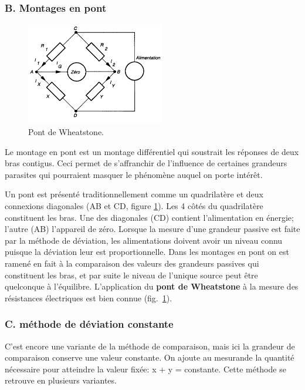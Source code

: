 \subsubsection{B. Montages en pont}

\begin{figure}
   \centering
   \includegraphics[width=6cm]{assets/figures/wheatstone.pdf}
   \caption{Pont de Wheatstone.}
   \label{fig:pont}
\end{figure}
Le montage en pont est un montage différentiel qui soustrait les réponses de deux bras contigus. Ceci permet de s'affranchir de l'influence de certaines grandeurs parasites qui pourraient masquer le phénomène auquel on porte intérêt.

Un pont est présenté traditionnellement comme un quadrilatère et deux connexions diagonales (AB et CD, figure \ref{fig:pont}). Les 4 côtés du quadrilatère constituent les bras. Une des diagonales (CD) contient l'alimentation en énergie; l'autre (AB) l'appareil de zéro. Lorsque la mesure d'une grandeur passive est faite par la méthode de déviation, les alimentations doivent avoir un niveau connu puisque la déviation leur est proportionnelle. Dans les montages en pont on est ramené en fait à la comparaison des valeurs des grandeurs passives qui constituent les bras, et par suite le niveau de l'unique source peut être quelconque à l'équilibre. L'application du \textbf{pont de Wheatstone} à la mesure des résistances électriques est bien connue (fig.~\ref{fig:pont}).

\subsubsection{C. méthode de déviation constante}

C'est encore une variante de la méthode de comparaison, mais ici la grandeur de comparaison conserve une valeur constante.  On ajoute au mesurande la quantité nécessaire pour atteindre la valeur fixée: x + y = constante. Cette méthode se retrouve en plusieurs variantes.

